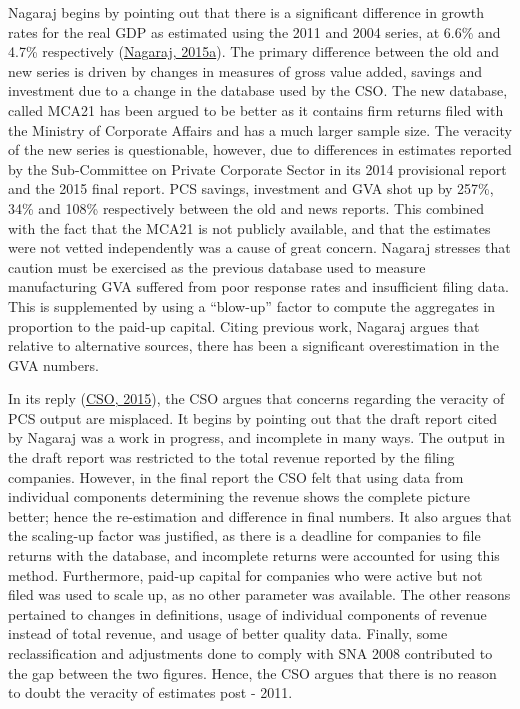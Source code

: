 \documentclass[12pt,nobind, a4paper]{reedthesis}
\begin{document}
 Nagaraj begins by pointing out that there is a significant difference in growth rates for the real GDP as estimated using the 2011 and 2004 series, at 6.6\% and 4.7\% respectively (\protect\hyperlink{ref-nagaraj_seeds_2015-1}{Nagaraj, 2015a}). The primary difference between the old and new series is driven by changes in measures of gross value added, savings and investment due to a change in the database used by the CSO. The new database, called MCA21 has been argued to be better as it contains firm returns filed with the Ministry of Corporate Affairs and has a much larger sample size. The veracity of the new series is questionable, however, due to differences in estimates reported by the Sub-Committee on Private Corporate Sector in its 2014 provisional report and the 2015 final report. PCS savings, investment and GVA shot up by 257\%, 34\% and 108\% respectively between the old and news reports. This combined with the fact that the MCA21 is not publicly available, and that the estimates were not vetted independently was a cause of great concern. Nagaraj stresses that caution must be exercised as the previous database used to measure manufacturing GVA suffered from poor response rates and insufficient filing data. This is supplemented by using a ``blow-up'' factor to compute the aggregates in proportion to the paid-up capital. Citing previous work, Nagaraj argues that relative to alternative sources, there has been a significant overestimation in the GVA numbers.
 \linebreak

 In its reply (\protect\hyperlink{ref-cso_no_2015}{CSO, 2015}), the CSO argues that concerns regarding the veracity of PCS output are misplaced. It begins by pointing out that the draft report cited by Nagaraj was a work in progress, and incomplete in many ways. The output in the draft report was restricted to the total revenue reported by the filing companies. However, in the final report the CSO felt that using data from individual components determining the revenue shows the complete picture better; hence the re-estimation and difference in final numbers. It also argues that the scaling-up factor was justified, as there is a deadline for companies to file returns with the database, and incomplete returns were accounted for using this method. Furthermore, paid-up capital for companies who were active but not filed was used to scale up, as no other parameter was available. The other reasons pertained to changes in definitions, usage of individual components of revenue instead of total revenue, and usage of better quality data. Finally, some reclassification and adjustments done to comply with SNA 2008 contributed to the gap between the two figures. Hence, the CSO argues that there is no reason to doubt the veracity of estimates post - 2011.
 \linebreak
\end{document}
